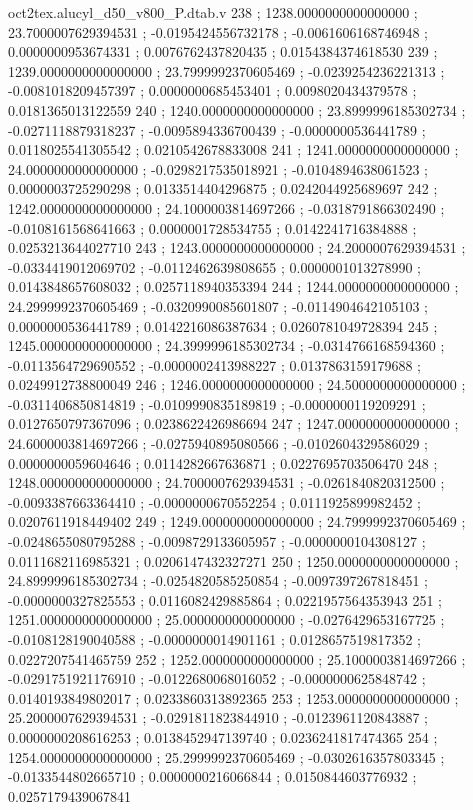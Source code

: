 \begin{filecontents}[overwrite]{oct2tex.alucyl_d50_v800_P.dtab.v}
238 ; 1238.0000000000000000 ; 23.7000007629394531 ; -0.0195424556732178 ; -0.0061606168746948 ; 0.0000000953674331 ; 0.0076762437820435 ; 0.0154384374618530
239 ; 1239.0000000000000000 ; 23.7999992370605469 ; -0.0239254236221313 ; -0.0081018209457397 ; 0.0000000685453401 ; 0.0098020434379578 ; 0.0181365013122559
240 ; 1240.0000000000000000 ; 23.8999996185302734 ; -0.0271118879318237 ; -0.0095894336700439 ; -0.0000000536441789 ; 0.0118025541305542 ; 0.0210542678833008
241 ; 1241.0000000000000000 ; 24.0000000000000000 ; -0.0298217535018921 ; -0.0104894638061523 ; 0.0000003725290298 ; 0.0133514404296875 ; 0.0242044925689697
242 ; 1242.0000000000000000 ; 24.1000003814697266 ; -0.0318791866302490 ; -0.0108161568641663 ; 0.0000001728534755 ; 0.0142241716384888 ; 0.0253213644027710
243 ; 1243.0000000000000000 ; 24.2000007629394531 ; -0.0334419012069702 ; -0.0112462639808655 ; 0.0000001013278990 ; 0.0143848657608032 ; 0.0257118940353394
244 ; 1244.0000000000000000 ; 24.2999992370605469 ; -0.0320990085601807 ; -0.0114904642105103 ; 0.0000000536441789 ; 0.0142216086387634 ; 0.0260781049728394
245 ; 1245.0000000000000000 ; 24.3999996185302734 ; -0.0314766168594360 ; -0.0113564729690552 ; -0.0000002413988227 ; 0.0137863159179688 ; 0.0249912738800049
246 ; 1246.0000000000000000 ; 24.5000000000000000 ; -0.0311406850814819 ; -0.0109990835189819 ; -0.0000000119209291 ; 0.0127650797367096 ; 0.0238622426986694
247 ; 1247.0000000000000000 ; 24.6000003814697266 ; -0.0275940895080566 ; -0.0102604329586029 ; 0.0000000059604646 ; 0.0114282667636871 ; 0.0227695703506470
248 ; 1248.0000000000000000 ; 24.7000007629394531 ; -0.0261840820312500 ; -0.0093387663364410 ; -0.0000000670552254 ; 0.0111925899982452 ; 0.0207611918449402
249 ; 1249.0000000000000000 ; 24.7999992370605469 ; -0.0248655080795288 ; -0.0098729133605957 ; -0.0000000104308127 ; 0.0111682116985321 ; 0.0206147432327271
250 ; 1250.0000000000000000 ; 24.8999996185302734 ; -0.0254820585250854 ; -0.0097397267818451 ; -0.0000000327825553 ; 0.0116082429885864 ; 0.0221957564353943
251 ; 1251.0000000000000000 ; 25.0000000000000000 ; -0.0276429653167725 ; -0.0108128190040588 ; -0.0000000014901161 ; 0.0128657519817352 ; 0.0227207541465759
252 ; 1252.0000000000000000 ; 25.1000003814697266 ; -0.0291751921176910 ; -0.0122680068016052 ; -0.0000000625848742 ; 0.0140193849802017 ; 0.0233860313892365
253 ; 1253.0000000000000000 ; 25.2000007629394531 ; -0.0291811823844910 ; -0.0123961120843887 ; 0.0000000208616253 ; 0.0138452947139740 ; 0.0236241817474365
254 ; 1254.0000000000000000 ; 25.2999992370605469 ; -0.0302616357803345 ; -0.0133544802665710 ; 0.0000000216066844 ; 0.0150844603776932 ; 0.0257179439067841

\end{filecontents}
